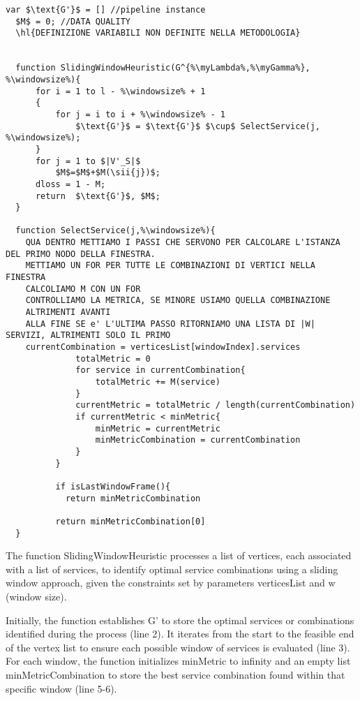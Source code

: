 \begin{lstlisting}[frame=single, escapechar=\%,mathescape, caption={Sliding Window Heuristic with Selection of First Service from Optimal Combination},label={lst:slidingwindowfirstservice}]
  var $\text{G'}$ = [] //pipeline instance
  $M$ = 0; //DATA QUALITY
  \hl{DEFINIZIONE VARIABILI NON DEFINITE NELLA METODOLOGIA}


  function SlidingWindowHeuristic(G^{%\myLambda%,%\myGamma%}, %\windowsize%){
      for i = 1 to l - %\windowsize% + 1
      {
          for j = i to i + %\windowsize% - 1
              $\text{G'}$ = $\text{G'}$ $\cup$ SelectService(j, %\windowsize%);
      }
      for j = 1 to $|V'_S|$
          $M$=$M$+$M(\sii{j})$;
      dloss = 1 - M;
      return  $\text{G'}$, $M$;
  }

  function SelectService(j,%\windowsize%){
    QUA DENTRO METTIAMO I PASSI CHE SERVONO PER CALCOLARE L'ISTANZA DEL PRIMO NODO DELLA FINESTRA.
    METTIAMO UN FOR PER TUTTE LE COMBINAZIONI DI VERTICI NELLA FINESTRA
    CALCOLIAMO M CON UN FOR
    CONTROLLIAMO LA METRICA, SE MINORE USIAMO QUELLA COMBINAZIONE
    ALTRIMENTI AVANTI
    ALLA FINE SE e' L'ULTIMA PASSO RITORNIAMO UNA LISTA DI |W| SERVIZI, ALTRIMENTI SOLO IL PRIMO
    currentCombination = verticesList[windowIndex].services
              totalMetric = 0
              for service in currentCombination{
                  totalMetric += M(service)
              }
              currentMetric = totalMetric / length(currentCombination)
              if currentMetric < minMetric{
                  minMetric = currentMetric
                  minMetricCombination = currentCombination
              }
          }

          if isLastWindowFrame(){
            return minMetricCombination

          return minMetricCombination[0]
  }

  \end{lstlisting}

  The function SlidingWindowHeuristic processes a list of vertices, each associated with a list of services, to identify optimal service combinations using a sliding window approach, given the constraints set by parameters verticesList and w (window size).

  Initially, the function establishes $\text{G'}$ to store the optimal services or combinations identified during the process (line 2). It iterates from the start to the feasible end of the vertex list to ensure each possible window of services is evaluated (line 3). For each window, the function initializes minMetric to infinity and an empty list minMetricCombination to store the best service combination found within that specific window (line 5-6).


